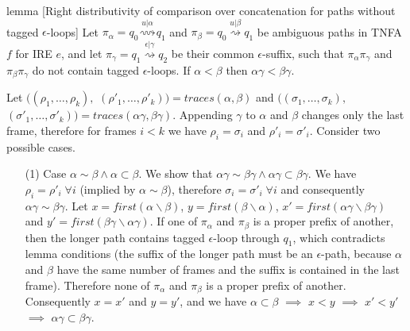 \documentclass[AMA,STIX1COL]{WileyNJD-v2}
\begin{document}
\begin{theoremEnd}[restate, no link to proof, no link to theorem, category=lemmata_closure]{lemma}
[Right distributivity of comparison over concatenation for paths without tagged $\epsilon$-loops]
    \label{lemma_closure_rightdist}
    Let
    $\pi_\alpha = q_0 \overset {u | \alpha} {\rightsquigarrow} q_1$ and
    $\pi_\beta  = q_0 \overset {u | \beta}  {\rightsquigarrow} q_1$
    be ambiguous paths in TNFA $f$ for IRE $e$,
    and let $\pi_\gamma = q_1 \overset {\epsilon | \gamma} {\rightsquigarrow} q_2$
    be their common $\epsilon$-suffix,
    such that $\pi_\alpha \pi_\gamma$ and $\pi_\beta \pi_\gamma$ do not contain tagged $\epsilon$-loops.
    If $\alpha < \beta$ then $\alpha \gamma < \beta \gamma$.
\end{theoremEnd}
\begin{proofEnd}
    Let
    $\big( (\rho_1, \hdots, \rho_k),$ $(\rho'_1, \hdots, \rho'_k) \big) = traces (\alpha, \beta)$ and
    $\big( (\sigma_1, \hdots, \sigma_k),$ $(\sigma'_1, \hdots, \sigma'_k) \big) = traces (\alpha \gamma, \beta \gamma)$.
    Appending $\gamma$ to $\alpha$ and $\beta$ changes only the last frame, therefore
    for frames $i < k$ we have $\rho_i = \sigma_i$ and $\rho'_i = \sigma'_i$.
    Consider two possible cases.
    \begin{itemize}[itemsep=0.5em, topsep=0.5em]
    \item[(1)]
        Case $\alpha \sim \beta \wedge \alpha \subset \beta$.
        We show that $\alpha \gamma \sim \beta \gamma \wedge \alpha \gamma \subset \beta \gamma$.
        We have $\rho_i = \rho'_i \; \forall i$ (implied by $\alpha \sim \beta$), therefore
        $\sigma_i = \sigma'_i \; \forall i$ and consequently $\alpha \gamma \sim \beta \gamma$.
        Let
        $x = first (\alpha \backslash \beta)$,
        $y = first (\beta \backslash \alpha)$,
        $x' = first (\alpha \gamma \backslash \beta \gamma)$ and
        $y' = first (\beta \gamma \backslash \alpha \gamma)$.
        If one of $\pi_\alpha$ and $\pi_\beta$ is a proper prefix of another,
        then the longer path contains tagged $\epsilon$-loop through $q_1$,
        which contradicts lemma conditions
        (the suffix of the longer path must be an $\epsilon$-path,
        because $\alpha$ and $\beta$ have the same number of frames
        and the suffix is contained in the last frame).
        Therefore none of $\pi_\alpha$ and $\pi_\beta$ is a proper prefix of another.
        Consequently $x = x'$ and $y = y'$, and we have
        $\alpha \subset \beta$
        $\implies$
        $x < y$
        $\implies$
        $x' < y'$
        $\implies$
        $\alpha \gamma \subset \beta \gamma$.


\end{itemize}
\end{proofEnd}
\end{document}
